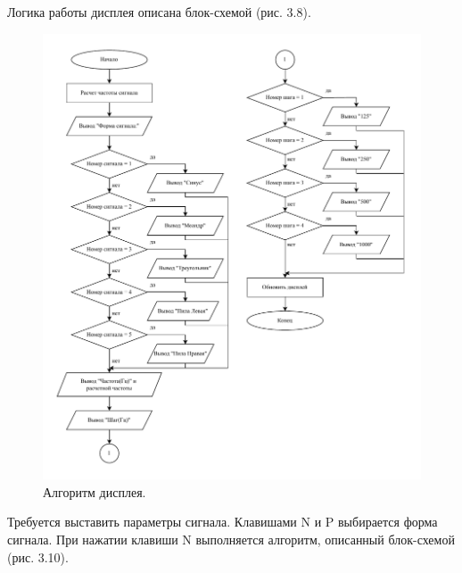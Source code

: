 	Логика работы дисплея описана блок-схемой (рис. 3.8).
	
	\begin{figure}[H]
    \centering
    \includegraphics[width=1\textwidth]{../image/display.pdf}
    \caption{Алгоритм дисплея.}
	\end{figure}	
	
	Требуется выставить параметры сигнала. Клавишами N и P выбирается форма сигнала. При нажатии клавиши N выполняется алгоритм, описанный блок-схемой (рис. 3.10).
	
